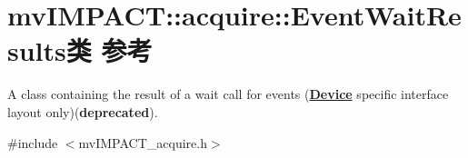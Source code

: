 \hypertarget{classmv_i_m_p_a_c_t_1_1acquire_1_1_event_wait_results}{\section{mv\+I\+M\+P\+A\+C\+T\+:\+:acquire\+:\+:Event\+Wait\+Results类 参考}
\label{classmv_i_m_p_a_c_t_1_1acquire_1_1_event_wait_results}
}


A class containing the result of a wait call for events ({\bfseries \hyperlink{classmv_i_m_p_a_c_t_1_1acquire_1_1_device}{Device}} specific interface layout only)({\bfseries deprecated}).  




{\ttfamily \#include $<$mv\+I\+M\+P\+A\+C\+T\+\_\+acquire.\+h$>$}


